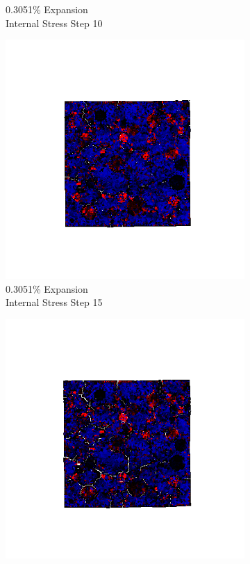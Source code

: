 \begin{figure}[ht!]
\begin{subfigure}{.25\textwidth}
      \caption{0.3051\% Expansion\\Internal Stress Step 10}
    \end{subfigure}%
    \begin{subfigure}{.25\textwidth}
      \centering
      \includegraphics[width=1.0\linewidth]{Files/exp_3D/ASR/A15P75_3_s15.png}
      \caption{0.3051\% Expansion\\Internal Stress Step 15}
    \end{subfigure}%
    \begin{subfigure}{.25\textwidth}
      \centering
      \includegraphics[width=1.0\linewidth]{Files/exp_3D/ASR/A15P75_3_stress.png}

\end{subfigure}
\end{figure}
